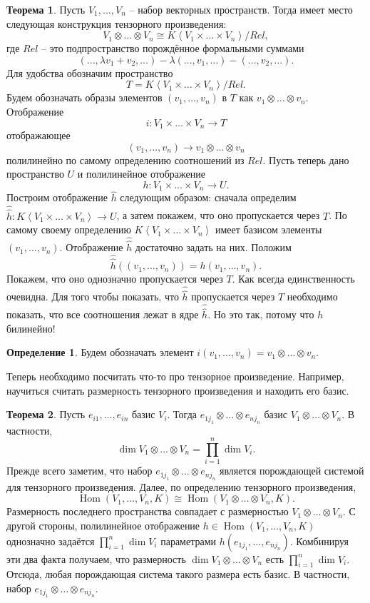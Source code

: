 \documentclass[10pt,a4paper,oneside]{book}
\theoremstyle{definition}
\newtheorem*{defn}{{\color{yellow!30!red} Определение}}
\newtheorem{thm}{{\color{red!40!black} Теорема}}
\newcommand{\Hom}{\operatorname{Hom}}
\def\lan{\left\langle }
\def\ran{\right\rangle}
\def\thrm{\begin{thm}}
\def\ethrm{\end{thm}}
\def\dfn{\begin{defn}}
\def\edfn{\end{defn}}
\begin{document}
\thrm Пусть $V_1,\dots,V_n$ -- набор векторных пространств. Тогда имеет место следующая конструкция тензорного произведения:
$$V_1 \otimes \dots \otimes V_n \cong K\lan V_1 \times \dots \times V_n \ran / Rel,$$
где $Rel$ -- это подпространство порождённое формальными суммами
$$(\dots, \lambda v_1+v_2, \dots) - \lambda (\dots,v_1, \dots) - (\dots, v_2, \dots).$$ 
\proof Для удобства обозначим пространство
$$T=K\lan V_1 \times \dots \times V_n \ran / Rel.$$ Будем обозначать образы элементов $(v_1,\dots, v_n)$ в $T$ как  $v_1\otimes \dots \otimes v_n$. Отображение $$i \colon V_1\times \dots \times V_n \to T$$
отображающее 
$$(v_1,\dots,v_n) \to v_1\otimes \dots \otimes v_n$$
полилинейно по самому определению соотношений из $Rel$. Пусть теперь дано пространство $U$ и полилинейное отображение $$h \colon V_1\times \dots \times V_n \to U.$$
Построим отображение $\hat{h}$ следующим образом: сначала определим $\hat{\hat{h}}\colon K\lan V_1 \times \dots \times V_n \ran \to U$, а затем покажем, что оно пропускается через $T$. По самому своему определению $K\lan V_1 \times \dots \times V_n \ran$ имеет базисом элементы $(v_1,\dots,v_n)$. Отображение $\hat{\hat{h}}$ достаточно задать на них. Положим $$\hat{\hat{h}}((v_1,\dots,v_n))=h(v_1,\dots,v_n).$$
Покажем, что оно однозначно пропускается через $T$. Как всегда единственность очевидна. Для того чтобы показать, что $\hat{\hat{h}}$ пропускается через $T$ необходимо показать, что все соотношения лежат в ядре $\hat{\hat{h}}$. Но это так, потому что $h$ билинейно! 
\endproof
\ethrm

\dfn Будем обозначать элемент $i(v_1,\dots,v_n)=v_1\otimes \dots \otimes v_n$. 
\edfn

Теперь необходимо посчитать что-то про тензорное произведение. Например, научиться считать размерность тензорного произведения и находить его базис.
\thrm Пусть $e_{i1},\dots,e_{in}$ базис $V_i$. Тогда $e_{1j_1}\otimes \dots \otimes e_{nj_n}$ базис $V_1 \otimes \dots \otimes V_n$. В частности, 
$$\dim V_1 \otimes \dots \otimes V_n= \prod_{i=1}^n \dim V_i.$$ 
\proof Прежде всего заметим, что набор $e_{1j_1}\otimes \dots \otimes e_{nj_n}$ является порождающей системой для тензорного произведения. Далее, по определению тензорного произведения,
$$\Hom(V_1,\dots,V_n, K) \cong \Hom(V_1\otimes \dots \otimes V_n,K).$$
Размерность последнего пространства совпадает с размерностью $V_1\otimes \dots \otimes V_n$. С другой стороны, полилинейное отображение $h \in \Hom(V_1,\dots,V_n, K)$ однозначно задаётся $\prod_{i=1}^n \dim V_i$  параметрами $h(e_{1j_1}, \dots,e_{nj_n})$. Комбинируя эти два факта получаем, что размерность $\dim V_1 \otimes \dots \otimes V_n$ есть $\prod_{i=1}^n \dim V_i$. Отсюда, любая порождающая система такого размера есть базис. В частности, набор $e_{1j_1}\otimes \dots \otimes e_{nj_n}$.
\endproof
\ethrm
\end{document}
